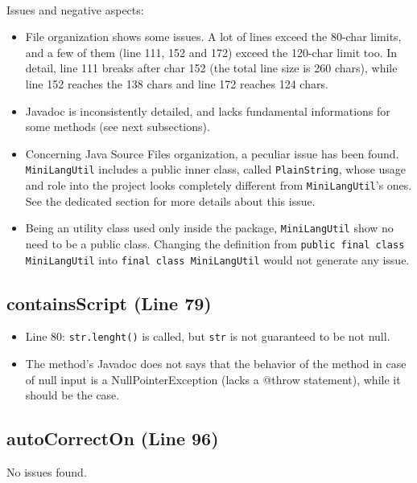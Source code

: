\documentclass[11pt]{article} %
\begin{document}
\hfill\\
Issues and negative aspects:
\begin{itemize}
	\item File organization shows some issues. A lot of lines exceed the 80-char limits, and a few of them (line 111, 152 and 172) exceed the 120-char limit too. In detail, line 111 breaks after char 152 (the total line size is 260 chars), while line 152 reaches the 138 chars and line 172 reaches 124 chars.

	\item Javadoc is inconsistently detailed, and lacks fundamental informations for some methods (see next subsections).

	\item Concerning Java Source Files organization, a peculiar issue has been found. \texttt{MiniLangUtil} includes a public inner class, called \texttt{PlainString}, whose usage and role into the project looks completely different from \texttt{MiniLangUtil}'s ones. See the dedicated section for more details about this issue.

	\item Being an utility class used only inside the package, \texttt{MiniLangUtil} show no need to be a public class. Changing the definition from \texttt{public final class MiniLangUtil} into \texttt{final class MiniLangUtil} would not generate any issue. 

\end{itemize}

\subsection{containsScript (Line 79)}
\begin{itemize}
	\item Line 80: \texttt{str.lenght()} is called, but \texttt{str} is not guaranteed to be not null. 
	\item The method's Javadoc does not says that the behavior of the method in case of null input is a NullPointerException (lacks a @throw statement), while it should be the case.
\end{itemize}

\subsection{autoCorrectOn (Line 96)}
No issues found.
\end{document}
